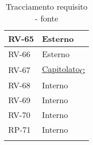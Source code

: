 \begin{longtable}{|>{\centering\arraybackslash}m{}|>{\centering\arraybackslash}m{}|}
	RV-65           & Esterno                                                                                                           \\\hline
	RV-66           & Esterno                                                                                                           \\\hline
	RV-67           & \href{https://7last.github.io/docs/pb/documentazione-interna/glossario\#capitolato}{Capitolato\textsubscript{G}} \\\hline
	RV-68           & Interno                                                                                                           \\\hline
	RV-69           & Interno                                                                                                           \\\hline
	RV-70           & Interno                                                                                                           \\\hline
	RP-71           & Interno        \\\hline

	\caption{Tracciamento requisito - fonte}
\end{longtable}

